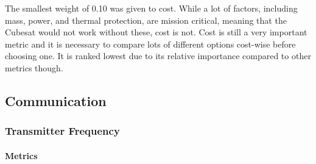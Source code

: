 The smallest weight of 0.10 was given to cost.  While a lot of factors, including mass, power, and thermal protection, are mission critical, meaning that the Cubesat would not work without these, cost is not.  Cost is still a very important metric and it is necessary to compare lots of different options cost-wise before choosing one.  It is ranked lowest due to its relative importance compared to other metrics though.\\
\subsection{Communication}
\subsubsection{Transmitter Frequency}
\paragraph{Metrics}
